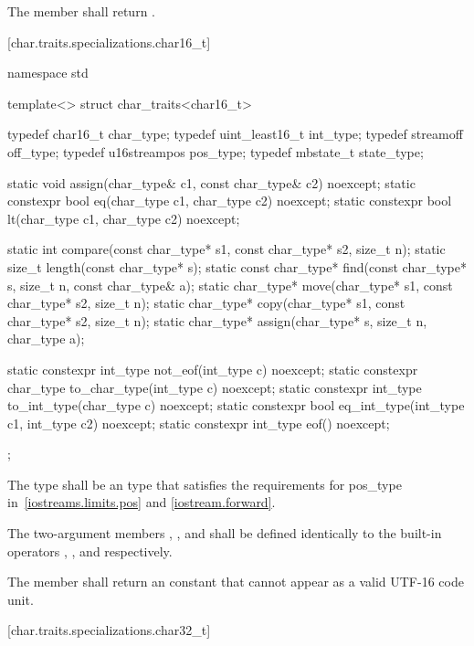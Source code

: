 \pnum
The member
shall return
.

[char.traits.specializations.char16_t]{}

%
\begin{codeblock}
namespace std {
  template<> struct char_traits<char16_t> {
    typedef char16_t        char_type;
    typedef uint_least16_t  int_type;
    typedef streamoff       off_type;
    typedef u16streampos    pos_type;
    typedef mbstate_t       state_type;

    static void assign(char_type& c1, const char_type& c2) noexcept;
    static constexpr bool eq(char_type c1, char_type c2) noexcept;
    static constexpr bool lt(char_type c1, char_type c2) noexcept;

    static int compare(const char_type* s1, const char_type* s2, size_t n);
    static size_t length(const char_type* s);
    static const char_type* find(const char_type* s, size_t n,
                                 const char_type& a);
    static char_type* move(char_type* s1, const char_type* s2, size_t n);
    static char_type* copy(char_type* s1, const char_type* s2, size_t n);
    static char_type* assign(char_type* s, size_t n, char_type a);

    static constexpr int_type not_eof(int_type c) noexcept;
    static constexpr char_type to_char_type(int_type c) noexcept;
    static constexpr int_type to_int_type(char_type c) noexcept;
    static constexpr bool eq_int_type(int_type c1, int_type c2) noexcept;
    static constexpr int_type eof() noexcept;
  };
}
\end{codeblock}

\pnum
The type
shall be an  type that satisfies the requirements
for pos_type in~\ref{iostreams.limits.pos} and \ref{iostream.forward}.

\pnum
The two-argument members ,
, and  shall be defined identically to
the built-in operators \tcode{=}, \tcode{==}, and
\tcode{<} respectively.

\pnum
The member  shall return an
 constant that cannot appear
as a valid UTF-16 code unit.

[char.traits.specializations.char32_t]{}

